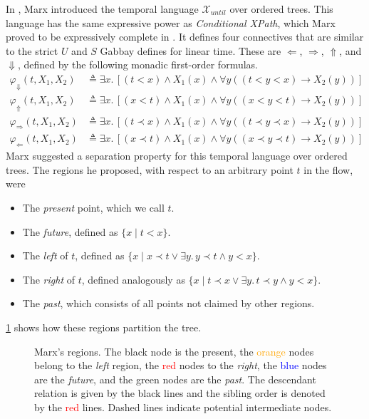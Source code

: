 \documentclass[a4paper,UKenglish,cleveref, autoref, thm-restate, numberwithinsect]{lipics-v2021}
\begin{document}
In \cite{xpathComplete}, Marx introduced the temporal language $\mathcal{X}_{until}$ over ordered trees. This language has the same expressive power as \textit{Conditional XPath}, which Marx proved to be expressively complete in \cite{marx2005conditional}. It defines four connectives that are similar to the strict $U$ and $S$ Gabbay defines for linear time. These are $\Leftarrow$, $\Rightarrow$, $\Uparrow$, and $\Downarrow$, defined by the following monadic first-order formulas.
\begin{equation*}
    \begin{aligned}
        \varphi_\Downarrow(t, X_1, X_2) &\triangleq \exists x.\, \left[ \left( t < x \right) \land X_1(x) \land \forall y \left( \left( t < y < x \right) \to X_2(y) \right) \right]\\
        \varphi_\Uparrow(t, X_1, X_2) &\triangleq \exists x.\, \left[ \left( x < t \right) \land X_1(x) \land \forall y \left( \left( x < y < t \right) \to X_2(y) \right) \right]\\
        \varphi_\Rightarrow(t, X_1, X_2) &\triangleq \exists x.\, \left[ \left( t \prec x \right) \land X_1(x) \land \forall y \left( \left( t \prec y \prec x \right) \to X_2(y) \right) \right]\\
        \varphi_\Leftarrow(t, X_1, X_2) &\triangleq \exists x.\, \left[ \left( x \prec t \right) \land X_1(x) \land \forall y \left( \left( x \prec y \prec t \right) \to X_2(y) \right) \right]
    \end{aligned}
\end{equation*}
Marx suggested a separation property for this temporal language over ordered trees. The regions he proposed, with respect to an arbitrary point $t$ in the flow, were
\begin{itemize} %
    \item The \textit{present} point, which we call $t$.
    \item The \textit{future}, defined as $\{x \mid t < x \}$.
    \item The \textit{left} of $t$, defined as $\{x \mid x \prec t \lor \exists y.\, y \prec t \land y < x \}$.
    \item The \textit{right} of $t$, defined analogously as $\{x \mid t \prec x \lor \exists y.\, t \prec y \land y < x \}$.
    \item The \textit{past}, which consists of all points not claimed by other regions.
\end{itemize}
\cref{fig:marx-regions} shows how these regions partition the tree.
\begin{figure}
    \centering
    \caption[]{Marx's regions. The black node is the present, the \textcolor{orange}{orange} nodes belong to the \textit{left} region, the \textcolor{red}{red} nodes to the \textit{right}, the \textcolor{blue}{blue} nodes are the \textit{future}, and the \textcolor{OliveGreen}{green} nodes are the \textit{past}. The descendant relation is given by the black lines and the sibling order is denoted by the \textcolor{red}{red} lines. Dashed lines indicate potential intermediate nodes.}
    \label{fig:marx-regions}
\end{figure}
\end{document}
